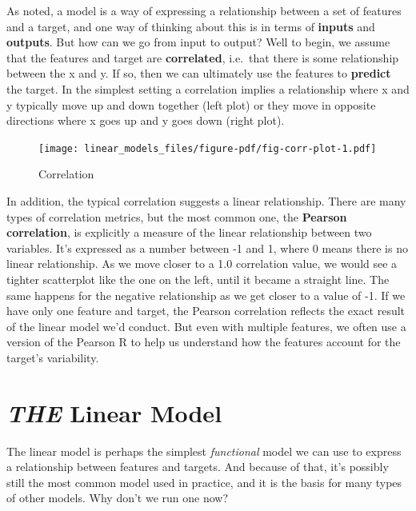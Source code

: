 \documentclass[
  letterpaper,
]{krantz}
\begin{document}
As noted, a model is a way of expressing a relationship between a set of
features and a target, and one way of thinking about this is in terms of
\textbf{inputs} and \textbf{outputs}. But how can we go from input to
output? Well to begin, we assume that the features and target are
\textbf{correlated}, i.e.~that there is some relationship between the x
and y. If so, then we can ultimately use the features to
\textbf{predict} the target. In the simplest setting a correlation
implies a relationship where x and y typically move up and down together
(left plot) or they move in opposite directions where x goes up and y
goes down (right plot).

\begin{figure}

{\centering \texttt{[image: linear\_models\_files/figure-pdf/fig-corr-plot-1.pdf]}

}

\caption{\label{fig-corr-plot}Correlation}

\end{figure}

In addition, the typical correlation suggests a linear relationship.
There are many types of correlation metrics, but the most common one,
the \textbf{Pearson correlation}, is explicitly a measure of the linear
relationship between two variables. It's expressed as a number between
-1 and 1, where 0 means there is no linear relationship. As we move
closer to a 1.0 correlation value, we would see a tighter scatterplot
like the one on the left, until it became a straight line. The same
happens for the negative relationship as we get closer to a value of -1.
If we have only one feature and target, the Pearson correlation reflects
the exact result of the linear model we'd conduct. But even with
multiple features, we often use a version of the Pearson R to help us
understand how the features account for the target's variability.

\section{\texorpdfstring{\emph{THE} Linear
Model}{THE Linear Model}}\label{the-linear-model}

The linear model is perhaps the simplest \emph{functional} model we can
use to express a relationship between features and targets. And because
of that, it's possibly still the most common model used in practice, and
it is the basis for many types of other models. Why don't we run one
now?
\end{document}
